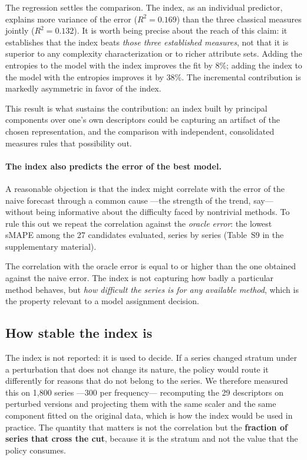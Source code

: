 The regression settles the comparison. The index, as an individual predictor, explains
more variance of the error ($R^{2}=0.169$) than the three classical measures jointly
($R^{2}=0.132$). It is worth being precise about the reach of this claim: it establishes
that the index beats \emph{those three established measures}, not that it is superior to
any complexity characterization or to richer attribute sets. Adding the entropies to the
model with the index improves the fit by 8\%; adding the index to the model with the
entropies improves it by 38\%. The incremental contribution is markedly asymmetric in
favor of the index.

This result is what sustains the contribution: an index built by principal components over
one's own descriptors could be capturing an artifact of the chosen representation, and the
comparison with independent, consolidated measures rules that possibility out.

\paragraph{The index also predicts the error of the best model.} A reasonable objection is
that the index might correlate with the error of the naive forecast through a common cause
---the strength of the trend, say--- without being informative about the difficulty faced
by nontrivial methods. To rule this out we repeat the correlation against the \emph{oracle
error}: the lowest sMAPE among the 27 candidates evaluated, series by series (Table~S9 in
the supplementary material).

The correlation with the oracle error is equal to or higher than the one obtained against
the naive error. The index is not capturing how badly a particular method behaves, but
\emph{how difficult the series is for any available method}, which is the property
relevant to a model assignment decision.

\subsection{How stable the index is}\label{sec:estabilidad}

The index is not reported: it is used to decide. If a series changed stratum under a
perturbation that does not change its nature, the policy would route it differently for
reasons that do not belong to the series. We therefore measured this on 1{,}800 series
---300 per frequency--- recomputing the 29 descriptors on perturbed versions and
projecting them with the same scaler and the same component fitted on the original data,
which is how the index would be used in practice. The quantity that matters is not the
correlation but the \textbf{fraction of series that cross the cut}, because it is the
stratum and not the value that the policy consumes.

